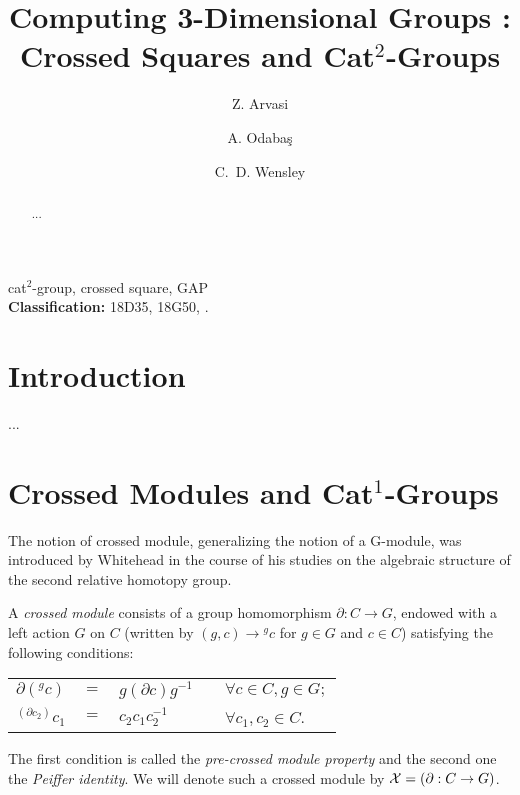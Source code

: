 \documentclass[a4paper,11pt]{article}
\theoremstyle{plain}
\theoremstyle{definition}
\begin{document}
\title{Computing 3-Dimensional Groups : Crossed Squares and  Cat$^2$-Groups}

\author[a]{Z. Arvasi}
\author[a]{A. Odaba\c{s}}
\author[b]{C.~D. Wensley}

\date{}

\maketitle

\begin{abstract}
...\end{abstract}

 cat$^2$-group, crossed square, \textsf{GAP}
\\ {\bf Classification:} 18D35, 18G50, .

\section{Introduction}

...

\section{Crossed Modules and Cat$^{1}$-Groups}

The notion of crossed module, generalizing the notion of a G-module, 
was introduced by Whitehead \cite{wayted} in the course of his studies on the
algebraic structure of the second relative homotopy group.

A \emph{crossed module} consists of a group homomorphism $\partial
:C\rightarrow G$, endowed with a left action $G$ on $C$ 
(written by $(g,c)\rightarrow {}^{g}c$ for $g\in G$ and $c\in C$) 
satisfying the
following conditions:

\begin{center}
	\begin{tabular}{rclll}
		$\partial (^{g}c)$ 
		& $=$ 
		& $g(\partial c)g^{-1}$ 
		&   & $\forall c\in C,g\in G; $ \\
		$^{(\partial c_{2})}c_{1}$ 
		& $=$ 
		& ${c}_{2}c_{1}c_{2}^{-1}$ 
		&   & $\forall c_{1},c_{2}\in C$. 
	\end{tabular}
\end{center}

The first condition is called the \emph{pre-crossed module property} 
and the second one the \emph{Peiffer identity}. 
We will denote such a crossed module by $\mathcal{X}=(\partial:C\rightarrow G)$.
\end{document}
